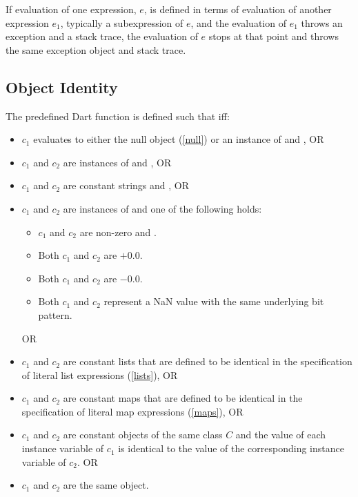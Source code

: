 \documentclass[makeidx]{article}
\begin{document}
{\LMHash{}%
If evaluation of one expression, $e$,
is defined in terms of evaluation of another expression $e_1$,
typically a subexpression of $e$,
and the evaluation of $e_1$ throws an exception and a stack trace,
the evaluation of $e$ stops at that point
and throws the same exception object and stack trace.


\subsection{Object Identity}

\LMHash{}%
The predefined Dart function 
is defined such that  if{}f:
\begin{itemize}
\item $c_1$ evaluates to either the null object (\ref{null})
  or an instance of  and , OR
\item $c_1$ and $c_2$ are instances of  and , OR
\item $c_1$ and $c_2$ are constant strings and , OR
\item $c_1$ and $c_2$ are instances of 
  and one of the following holds:
  \begin{itemize}
  \item $c_1$ and $c_2$ are non-zero and .
  \item Both $c_1$ and $c_2$ are $+0.0$.
  \item Both $c_1$ and $c_2$ are $-0.0$.
  \item Both $c_1$ and $c_2$ represent a NaN value
    with the same underlying bit pattern.
  \end{itemize}
 OR
\item $c_1$ and $c_2$ are constant lists that are defined to be identical
  in the specification of literal list expressions (\ref{lists}), OR
\item $c_1$ and $c_2$ are constant maps that are defined to be identical
  in the specification of literal map expressions (\ref{maps}), OR
\item $c_1$ and $c_2$ are constant objects of the same class $C$
  and the value of each instance variable of $c_1$ is identical to
  the value of the corresponding instance variable of $c_2$. OR
\item $c_1$ and $c_2$ are the same object.
\end{itemize}


}
\end{document}
